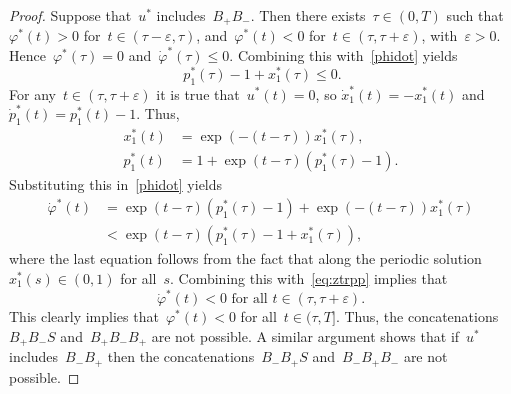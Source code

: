 \begin{proof}
	Suppose that~$u^*$ includes~$B_+B_-$.
	Then there exists~$\tau \in(0,T)$ such that~$\varphi^*(t)>0$ for~$t\in (\tau-\varepsilon,\tau)$, and~$\varphi^*(t)<0$ for~$t \in (\tau,\tau+\varepsilon)$, with~$\varepsilon>0$.
	Hence~$\varphi^*(\tau)=0$ and~$\dot \varphi^*(\tau)\leq 0$. 
	Combining this with~\eqref{phidot} yields
	\begin{equation} \label{eq:ztrpp}
		\ p_1^* (\tau)   - 1+ x_1^*  (\tau) \leq 0 . 
	\end{equation}
	For any~$t \in ( \tau,\tau+\varepsilon) $  it is true that~$u^*(t)=0$, so $\dot x_1^*(t)=-x_1^*(t)$ and~$\dot p_1^*(t) = p_1^*(t)-1 $. 
	Thus,
	\begin{subequations}
		\begin{align}
			x_1^*(t)&= \exp(-(t-\tau)) x_1^*(\tau), \\
			p_1^*(t)&=1+\exp(t-\tau)(p_1^*(\tau)-1).
		\end{align}
	\end{subequations}
	Substituting this in~\eqref{phidot} yields
	\begin{subequations}
		\begin{align}
			\dot \varphi^*(t)
			&= \exp(t-\tau)(p_1^*(\tau)-1)+ \exp(-(t-\tau)) x_1^*(\tau)\\
			&<\exp(t-\tau) \left (  p_1^*(\tau)-1  +  x_1^*(\tau) \right ) ,
		\end{align}
	\end{subequations}
	where the last equation follows from the fact that along the periodic solution~$x_1^*(s)\in (0,1)$ for all~$s$. 
	Combining this with~\eqref{eq:ztrpp} implies that
	\begin{equation}
	\dot \varphi^*(t) <0 \text{ for all } t \in (\tau,\tau+\varepsilon).
	\end{equation}
	This clearly  implies that~$\varphi^*(t)<0$ for all~$t\in(\tau,T]$.
	Thus, the concatenations~$B_+B_-S$ and~$B_+B_-B_+$ are not possible.
	A similar argument shows that if~$u^*$ includes~$B_- B_+$ then the concatenations~$B_ - B_+ S$ and~$B_- B_ + B_-$ are not possible.
\end{proof} 

